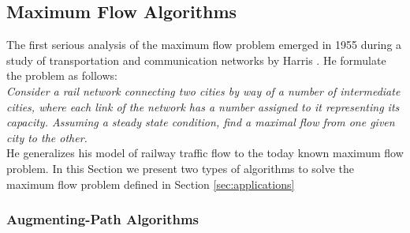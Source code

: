 
\subsection{Maximum Flow Algorithms}
\label{sec:max_flow}

The first serious analysis of the maximum flow problem emerged in 1955 during 
a study of transportation and communication networks by Harris \cite{harris1955}. 
He formulate the problem as follows: \\
\emph{Consider a rail network connecting two cities by way of a number of
intermediate cities, where each link of the network has a number assigned to
it representing its capacity. Assuming a steady state condition, find a maximal
flow from one given city to the other.} \\
He generalizes his model of railway traffic flow to the today known maximum 
flow problem. In this Section we present two types of algorithms to solve the
maximum flow problem defined in Section \ref{sec:applications}

\subsubsection{Augmenting-Path Algorithms}
\label{sec:aug_path}

